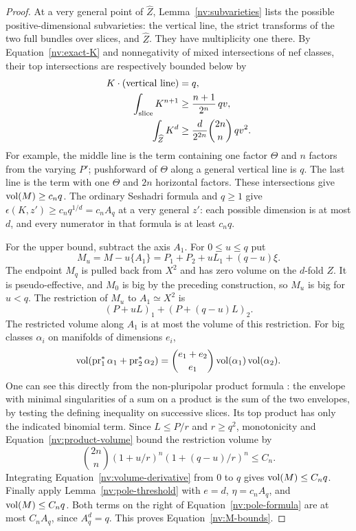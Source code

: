 \begin{proof}
At a very general point of \(\widehat Z\), Lemma~\ref{nv:subvarieties}
lists the possible positive-dimensional subvarieties: the vertical line,
the strict transforms of the two full bundles over slices, and
\(\widehat Z\).  They have multiplicity one there.  By
Equation~\eqref{nv:exact-K} and nonnegativity of mixed intersections of nef
classes, their top intersections are respectively bounded below by
\begin{align}
 K\cdot(\text{vertical line})&=q, \notag\\
 \int_{\text{slice}}K^{n+1}
  &\ge \frac{n+1}{2^n}\,qv,\label{nv:K-intersections}\\
 \int_{\widehat Z}K^d
  &\ge \frac{d}{2^{2n}}\binom{2n}{n}\,qv^2. \notag
\end{align}
For example, the middle line is the term containing one factor
\(\Theta\) and \(n\) factors from the varying \(P'\); pushforward of
\(\Theta\) along a general vertical line is \(q\).  The last line is the
term with one \(\Theta\) and \(2n\) horizontal factors.  These
intersections give \(\operatorname{vol}(M)\ge c_nq\).  The ordinary Seshadri formula
and \(q\ge1\) give
\(\epsilon(K,z')\ge c_nq^{1/d}=c_nA_q\) at a very general \(z'\):
each possible dimension is at most \(d\), and every numerator in that
formula is at least \(c_nq\).

For the upper bound, subtract the axis \(A_1\).  For \(0\le u\le q\) put
\[
 M_u=M-u\{A_1\}
     =P_1+P_2+uL_1+(q-u)\xi .
\]
The endpoint \(M_q\) is pulled back from \(X^2\) and has zero volume on
the \(d\)-fold \(Z\).  It is pseudo-effective, and \(M_0\) is big by
the preceding construction, so \(M_u\) is big for \(u<q\).  The
restriction of \(M_u\) to \(A_1\simeq X^2\) is
\[
 (P+uL)_1+(P+(q-u)L)_2.
\]
The restricted volume along \(A_1\) is at most the volume of this
restriction.  For big classes \(\alpha_i\) on manifolds of dimensions
\(e_i\),
\begin{equation}\label{nv:product-volume}
 \operatorname{vol}(\operatorname{pr}_1^*\alpha_1+\operatorname{pr}_2^*\alpha_2)
   =\binom{e_1+e_2}{e_1}\operatorname{vol}(\alpha_1)\operatorname{vol}(\alpha_2).
\end{equation}
One can see this directly from the non-pluripolar product formula
\cite{BEGZ2010}: the
envelope with minimal singularities of a sum on a product is the sum
of the two envelopes, by testing the defining inequality on successive
slices.  Its top product has only the indicated binomial term.  Since
\(L\le P/r\) and \(r\ge q^2\), monotonicity and
Equation~\eqref{nv:product-volume} bound the restriction volume by
\[
 \binom{2n}{n}(1+u/r)^n(1+(q-u)/r)^n\le C_n.
\]
Integrating Equation~\eqref{nv:volume-derivative} from \(0\) to \(q\) gives
\(\operatorname{vol}(M)\le C_nq\).  Finally apply
Lemma~\ref{nv:pole-threshold} with \(e=d\),
\(\eta=c_nA_q\), and \(\operatorname{vol}(M)\le C_nq\).
Both terms on the right of Equation~\eqref{nv:pole-formula} are at most
\(C_nA_q\), since \(A_q^d=q\).  This proves Equation~\eqref{nv:M-bounds}.
\end{proof}

